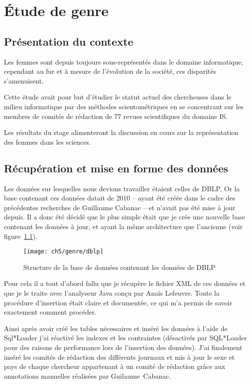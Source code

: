 \cleardoublepage
{}

\chapter{Étude de genre}\label{cha:genre}



	\section{Présentation du contexte}
		Les femmes sont depuis toujours sous-représentés dans le domaine informatique, cependant au fur et à mesure de l'évolution de la société, ces disparités s'amenuisent.
		
		 Cette étude avait pour but d'étudier le statut actuel des chercheuses dans le milieu informatique par des méthodes scientométriques en se concentrant sur les membres de comités de rédaction de 77 revues scientifiques du domaine IS.
		 
		Les résultats du stage alimenteront la discussion en cours sur la représentation des femmes dans les sciences.

	
	\section{Récupération et mise en forme des données}
		Les données sur lesquelles nous devions travailler étaient celles de DBLP. Or la base contenant ces données datait de 2010 -- ayant été créée dans le cadre des précédentes recherches de Guillaume Cabanac -- et n'avait pas été mise à jour depuis. Il a donc été décidé que le plus simple était que je crée une nouvelle base contenant les données à jour, et ayant la même architecture que l'ancienne (voir figure~\ref{fig:mcdDblp}).
		
		\begin{figure}[h]
			\centering
			\texttt{[image: ch5/genre/dblp]}
			\caption{Structure de la base de données contenant les données de DBLP}\label{fig:mcdDblp}
		\end{figure}
		
		Pour cela il a tout d'abord fallu que je récupère le fichier XML de ces données et que je le traite avec l'analyseur Java conçu par Anaïs Lefeuvre. Toute la procédure d'insertion était claire et documentée, ce qui m'a permis de savoir exactement comment procéder.
		
		 Ainsi après avoir créé les tables nécessaires et inséré les données à l'aide de Sql*Loader j'ai réactivé les indexes et les contraintes (désactivés par SQL*Loader pour des raisons de performance lors de l'insertion des données). J'ai finalement inséré les comités de rédaction des différents journaux et mis à jour le sexe et pays de chaque chercheur appartenant à un comité de rédaction grâce aux annotations manuelles réalisées par Guilaume~Cabanac.
	
